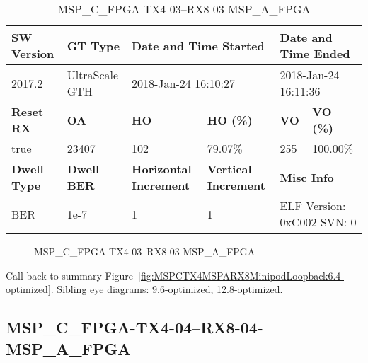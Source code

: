 \begin{table}[h]
\centering
\caption{MSP\_C\_FPGA-TX4-03--RX8-03-MSP\_A\_FPGA}
\label{tab:MSPCFPGATX403RX803MSPAFPGA6.4-optimized}
\begin{tabular}{@{}|l|l|l|l|l|l|@{}}
\toprule
\textbf{SW Version}                & \textbf{GT Type}   & \multicolumn{2}{l|}{\textbf{Date and Time Started}}            & \multicolumn{2}{l|}{\textbf{Date and Time Ended}}        \\ \midrule
2017.2                       & UltraScale GTH          & \multicolumn{2}{l|}{2018-Jan-24 16:10:27}                   & \multicolumn{2}{l|}{2018-Jan-24 16:11:36}               \\ \midrule
\textbf{Reset RX}                  & \textbf{OA} & \textbf{HO}   & \textbf{HO (\%)} & \textbf{VO} & \textbf{VO (\%)} \\ \midrule
true & 23407        & 102          & 79.07\%        & 255        & 100.00\%       \\ \midrule
\textbf{Dwell Type}                & \textbf{Dwell BER} & \textbf{Horizontal Increment} & \textbf{Vertical Increment}    & \multicolumn{2}{l|}{\textbf{Misc Info}}                  \\ \midrule
BER                            & 1e-7        & 1        & 1           & \multicolumn{2}{l|}{ELF Version: 0xC002 SVN: 0}                         \\ \bottomrule
\end{tabular}
\end{table}

\begin{figure}[h]
\caption{MSP\_C\_FPGA-TX4-03--RX8-03-MSP\_A\_FPGA} \label{fig:MSPCFPGATX403RX803MSPAFPGA6.4-optimized}
\end{figure}

Call back to summary Figure~\ref{fig:MSPCTX4MSPARX8MinipodLoopback6.4-optimized}.
Sibling eye diagrams: \hyperref[sec:MSPCFPGATX403RX803MSPAFPGA9.6-optimized]{9.6-optimized}, \hyperref[sec:MSPCFPGATX403RX803MSPAFPGA12.8-optimized]{12.8-optimized}.

\clearpage
\newpage


\subsection{MSP\_C\_FPGA-TX4-04--RX8-04-MSP\_A\_FPGA}\label{sec:MSPCFPGATX404RX804MSPAFPGA6.4-optimized}

